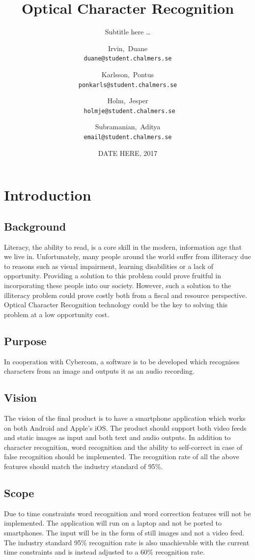 \documentclass[a4paper, english]{scrartcl}
\title{Optical Character Recognition}
\subtitle{Subtitle here \ldots}
\author{Irvin,~Duane \\ \texttt{duane@student.chalmers.se}
  \and Karlsson,~Pontus \\ \texttt{ponkarls@student.chalmers.se}
  \and Holm,~Jesper \\ \texttt{~holmje@student.chalmers.se}
  \and Subramanian,~Aditya \\ \texttt{email@student.chalmers.se}
}
\date{DATE HERE, 2017}
\begin{document}
\clearpage\maketitle
\thispagestyle{empty}

\pagebreak

\setcounter{page}{1}
\hypersetup{linkcolor=black}
\tableofcontents

\pagebreak

\section{Introduction}
\subsection{Background}
Literacy, the ability to read, is a core skill in the modern, information age
that we live in. Unfortunately, many people around the world suffer from
illiteracy due to reasons such as visual impairment, learning disabilities or
a lack of opportunity. Providing a solution to this problem could prove
fruitful in incorporating these people into our society. However, such a
solution to the illiteracy problem could prove costly both from a fiscal and
resource perspective. Optical Character Recognition technology could be the
key to solving this problem at a low opportunity cost.
\subsection{Purpose}
In cooperation with Cybercom, a software is to be developed which recognises
characters from an image and outputs it as an audio recording.
\subsection{Vision}
The vision of the final product is to have a smartphone application which
works on both Android and Apple’s iOS. The product should support both video
feeds and static images as input and both text and audio outputs. In addition
to character recognition, word recognition and the ability to self-correct in
case of false recognition should be implemented. The recognition rate of all
the above features should match the industry standard of 95\%.

\subsection{Scope}
Due to time constraints word recognition and word correction features will not
 be implemented. The application will run on a laptop and not be ported to
 smartphones. The input will be in the form of still images and not a video
 feed. The industry standard 95\% recognition rate is also unachievable with
 the current time constraints and is instead adjusted to a 60\% recognition
 rate.
\end{document}
